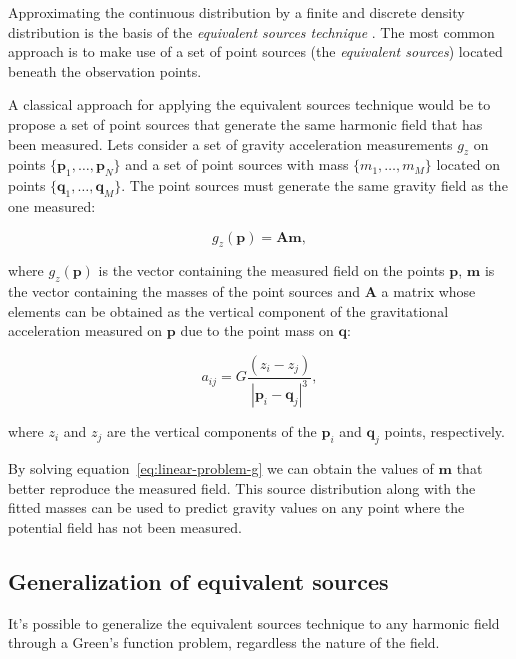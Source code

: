 \documentclass[twocolumn]{article}
\begin{document}
Approximating the continuous distribution by a finite and discrete density
distribution is the basis of the \emph{equivalent sources technique}
\citep{dampney1969}.
The most common approach is to make use of a set of point sources (the
\emph{equivalent sources}) located beneath the observation points.

A classical approach for applying the equivalent sources technique would be to
propose a set of point sources that generate the same harmonic field that has
been measured.
Lets consider a set of gravity acceleration measurements $g_z$ on points
$\{\mathbf{p}_1, \ldots, \mathbf{p}_N\}$ and a set of point sources with mass
$\{m_1, \ldots, m_M\}$ located on points
$\{\mathbf{q}_1, \ldots, \mathbf{q}_M\}$.
The point sources must generate the same gravity field as the one measured:

\begin{equation}
    g_z(\mathbf{p}) = \mathbf{A} \mathbf{m},
    \label{eq:linear-problem-g}
\end{equation}

\noindent where $g_z(\mathbf{p})$ is the vector containing the measured
field on the points $\mathbf{p}$, $\mathbf{m}$ is the vector containing the
masses of the point sources and $\mathbf{A}$ a matrix whose
elements can be obtained as the vertical component of the gravitational
acceleration measured on $\mathbf{p}$ due to the point mass on $\mathbf{q}$:

\begin{equation}
    a_{ij} = G \frac{(z_i - z_j)}{|\mathbf{p}_i - \mathbf{q}_j|^3},
\end{equation}

\noindent where $z_i$ and $z_j$ are the vertical components of the
$\mathbf{p}_i$ and $\mathbf{q}_j$ points, respectively.

By solving equation~\ref{eq:linear-problem-g} we can obtain the values of
$\mathbf{m}$ that better reproduce the measured field.
This source distribution along with the fitted masses can be used to predict
gravity values on any point where the potential field has not been measured.


\subsection{Generalization of equivalent sources}

It's possible to generalize the equivalent sources technique to any harmonic
field through a Green's function problem, regardless the nature of the field.
\end{document}

